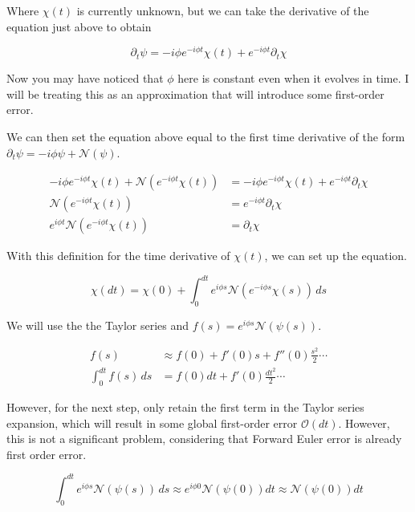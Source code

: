 \documentclass[11pt]{article}
\theoremstyle{definition}
\begin{document}
Where $\chi(t)$ is currently unknown, but we can take the derivative of the equation just above to obtain

\begin{equation}
\label{eq:dchi}
\partial_t \psi = -i \phi e^{-i \phi t} \chi(t) + e^{-i \phi t} \partial_t \chi
\end{equation}

Now you may have noticed that $\phi$ here is constant even when it evolves in time. I will be treating this as an approximation that will introduce some first-order error.

We can then set the equation above equal to the first time derivative of the form $\partial_t \psi = -i \phi \psi + \mathcal{N}(\psi)$.

\begin{align}
-i \phi e^{-i \phi t} \chi(t) + \mathcal{N}(e^{-i \phi t} \chi(t)) &= -i \phi e^{-i \phi t} \chi(t) + e^{-i \phi t} \partial_t \chi \label{eq:setequal}\\
\mathcal{N}(e^{-i \phi t} \chi(t)) &= e^{-i \phi t} \partial_t \chi \label{eq:setequal2}\\
e^{i \phi t} \mathcal{N}(e^{-i \phi t} \chi(t)) &= \partial_t \chi \label{eq:dchi-dt}
\end{align}

With this definition for the time derivative of $\chi(t)$, we can set up the equation.

\begin{equation}
\label{eq:chi-integral}
\chi(dt) = \chi(0) + \int_0^{dt} e^{i \phi s} \mathcal{N}(e^{-i \phi s} \chi(s)) \, ds
\end{equation}

We will use the the Taylor series and $f(s) = e^{i \phi s} \mathcal{N}(\psi(s))$.

\begin{align}
f(s) &\approx f(0) + f'(0) s + f''(0) \frac{s^2}{2} \cdots \label{eq:taylor-f}\\
\int_0^{dt} f(s) \, ds &= f(0) dt + f'(0) \frac{dt^2}{2} \cdots \label{eq:taylor-int}
\end{align}

However, for the next step, only retain the first term in the Taylor series expansion, which will result in some global first-order error $\mathcal{O}(dt)$. However, this is not a significant problem, considering that Forward Euler error is already first order error.

\begin{equation}
\label{eq:integral-approx}
\int_0^{dt} e^{i \phi s} \mathcal{N}(\psi(s)) \, ds \approx e^{i \phi 0} \mathcal{N}(\psi(0)) dt \approx \mathcal{N}(\psi(0)) dt
\end{equation}
\end{document}
